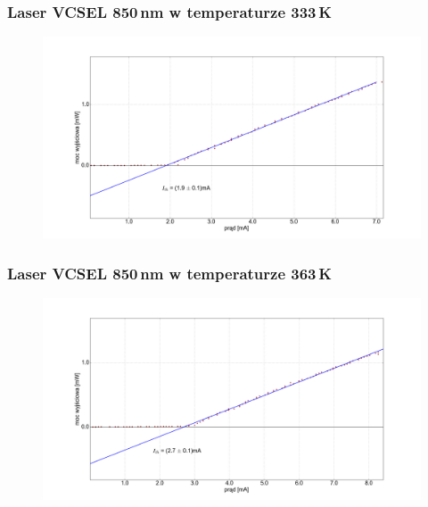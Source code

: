 \documentclass[xcolor={dvipsnames,table}]{beamer}
\begin{document}
\begin{frame}
\frametitle{Laser VCSEL 850\,nm w temperaturze 333\,K}
\center
\begin{figure}
   \includegraphics[width=1.10\textwidth,natwidth=69,natheight=87]{vcsel850/temp_60_fit.png}
\end{figure}
\end{frame}

\begin{frame}
\frametitle{Laser VCSEL 850\,nm w temperaturze 363\,K}
\center
\begin{figure}
   \includegraphics[width=1.10\textwidth,natwidth=69,natheight=87]{vcsel850/temp_90_fit.png}
\end{figure}
\end{frame}
\end{document}
